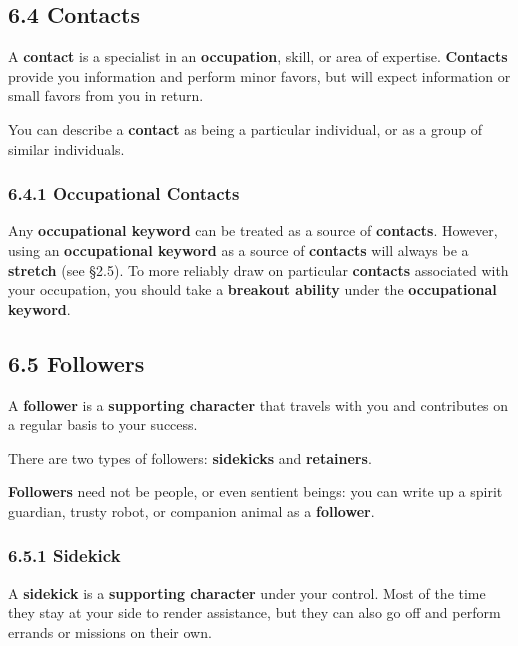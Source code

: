 \documentclass[
  11pt,
]{article}
\begin{document}
\hypertarget{contacts}{%
\subsection{6.4 Contacts}\label{contacts}}

A \textbf{contact} is a specialist in an \textbf{occupation}, skill, or
area of expertise. \textbf{Contacts} provide you information and perform
minor favors, but will expect information or small favors from you in
return.

You can describe a \textbf{contact} as being a particular individual, or
as a group of similar individuals.

\hypertarget{occupational-contacts}{%
\subsubsection{6.4.1 Occupational
Contacts}\label{occupational-contacts}}

Any \textbf{occupational keyword} can be treated as a source of
\textbf{contacts}. However, using an \textbf{occupational keyword} as a
source of \textbf{contacts} will always be a \textbf{stretch} (see
§2.5). To more reliably draw on particular \textbf{contacts} associated
with your occupation, you should take a \textbf{breakout ability} under
the \textbf{occupational keyword}.

\hypertarget{followers-2}{%
\subsection{6.5 Followers}\label{followers-2}}

A \textbf{follower} is a \textbf{supporting character} that travels with
you and contributes on a regular basis to your success.

There are two types of followers: \textbf{sidekicks} and
\textbf{retainers}.

\textbf{Followers} need not be people, or even sentient beings: you can
write up a spirit guardian, trusty robot, or companion animal as a
\textbf{follower}.

\hypertarget{sidekick}{%
\subsubsection{6.5.1 Sidekick}\label{sidekick}}

A \textbf{sidekick} is a \textbf{supporting character} under your
control. Most of the time they stay at your side to render assistance,
but they can also go off and perform errands or missions on their own.
\end{document}
